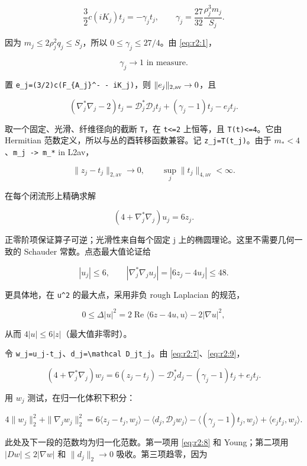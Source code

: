 \documentclass[UTF8,11pt,fontset=none]{ctexart}
\begin{document}
\[
 \frac32c(iK_j)t_j=-\gamma_jt_j,
 \qquad\gamma_j=\frac{27}{32}\frac{\rho_j^3m_j}{S_j}.
 \tag{2.6}\label{eq:r2:6}
\]

因为 \(m_j\le2\rho_j^2q_j\le S_j\)，所以 \(0\le\gamma_j\le27/4\)。由 \eqref{eq:r2:1}，

\[
 \gamma_j\longrightarrow1\text{ in measure}.
\]

置 \texttt{e\_j=(3/2)c(F\_\{A\_j\}\^{}-\ -\ iK\_j)}，则 \(\|e_j\|_{2,\rm av}\to0\)，且

\[
 (\nabla_j^*\nabla_j-2)t_j
 =\mathcal D_j^*\mathcal D_jt_j+(\gamma_j-1)t_j-e_jt_j.
 \tag{2.7}\label{eq:r2:7}
\]

取一个固定、光滑、纤维径向的截断 \texttt{T}，在 \texttt{\textbar{}t\textbar{}\textless{}=2} 上恒等，且 \texttt{\textbar{}T(t)\textbar{}\textless{}=4}。它由 Hermitian 范数定义，所以与丛的酉转移函数兼容。记 \texttt{z\_j=T(t\_j)}。由于 \(m_*<4\)、\texttt{m\_j\ -\textgreater{}\ m\_*} in L2av，

\[
 \|z_j-t_j\|_{2,\mathrm{av}}\longrightarrow0,
 \qquad \sup_j\|t_j\|_{4,\mathrm{av}}<\infty.
 \tag{2.8}\label{eq:r2:8}
\]

在每个闭流形上精确求解

\[
 \boxed{(4+\nabla_j^*\nabla_j)u_j=6z_j.}
 \tag{2.9}\label{eq:r2:9}
\]

正零阶项保证算子可逆；光滑性来自每个固定 j 上的椭圆理论。这里不需要几何一致的 Schauder 常数。点态最大值论证给

\[
 |u_j|\le6,\qquad
 |\nabla_j^*\nabla_j u_j|=|6z_j-4u_j|\le48.
\]

更具体地，在 \texttt{\textbar{}u\textbar{}\^{}2} 的最大点，采用非负 rough Laplacian 的规范，

\[
 0\le\Delta|u|^2
 =2\operatorname{Re}\langle6z-4u,u\rangle-2|\nabla u|^2,
\]

从而 \(4|u|\le6|z|\)（最大值非零时）。

令 \texttt{w\_j=u\_j-t\_j}、\texttt{d\_j=\textbackslash{}mathcal\ D\_jt\_j}。由 \eqref{eq:r2:7}、\eqref{eq:r2:9}，

\[
 (4+\nabla_j^*\nabla_j)w_j
 =6(z_j-t_j)-\mathcal D_j^*d_j-(\gamma_j-1)t_j+e_jt_j.
 \tag{2.10}\label{eq:r2:10}
\]

用 \(w_j\) 测试，在归一化体积下积分：

\[
 4\|w_j\|_2^2+\|\nabla_jw_j\|_2^2
 =6\langle z_j-t_j,w_j\rangle
 -\langle d_j,\mathcal D_jw_j\rangle
 -\langle(\gamma_j-1)t_j,w_j\rangle
 +\langle e_jt_j,w_j\rangle.
\]

此处及下一段的范数均为归一化范数。第一项用 \eqref{eq:r2:8} 和 Young；第二项用 \(|Dw|\le2|\nabla w|\) 和 \(\|d_j\|_2\to0\) 吸收。第三项趋零，因为
\end{document}
